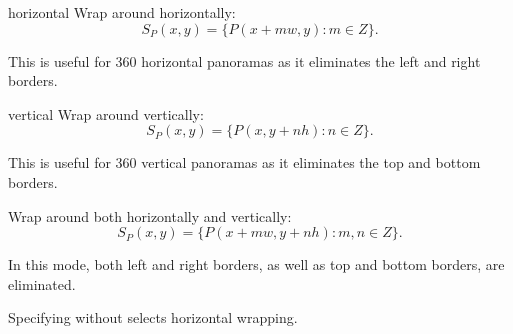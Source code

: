 \begin{codelist}
\begin{codelist}
  \item[horizontal]\itemend
    Wrap around horizontally:
    \[
    S_P(x, y) = \{P(x + m w, y): m \in Z\}.
    \]

    This is useful for 360\angulardegree{} horizontal panoramas as it eliminates the left and
    right borders.

  \item[vertical]\itemend
    Wrap around vertically:
    \[
    S_P(x, y) = \{P(x, y + n h): n \in Z\}.
    \]

    This is useful for 360\angulardegree{} vertical panoramas as it eliminates the top and
    bottom borders.

  \item[\itempar{both \\ horizontal+vertical
      \\ vertical+horizontal}]\itemend
    Wrap around both horizontally and vertically:
    \[
    S_P(x, y) = \{P(x + m w, y + n h): m, n \in Z\}.
    \]

    In this mode, both left and right borders, as well as top and bottom borders, are
    eliminated.
  \end{codelist}

  Specifying  without  selects horizontal
  wrapping.
\end{codelist}



